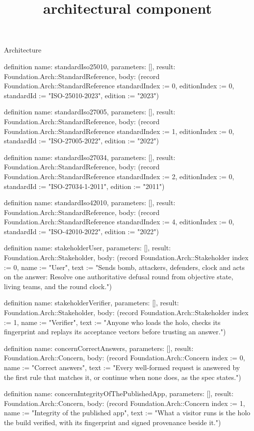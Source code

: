 \begin{lexlean}{Architecture}
\title{architectural component}
\begin{semanticmodule}
definition{
  name: standardIso25010,
  parameters: [],
  result: Foundation.Arch::StandardReference,
  body: (record Foundation.Arch::StandardReference {standardIndex := 0, editionIndex := 0, standardId := "ISO-25010-2023", edition := "2023"})
}

definition{
  name: standardIso27005,
  parameters: [],
  result: Foundation.Arch::StandardReference,
  body: (record Foundation.Arch::StandardReference {standardIndex := 1, editionIndex := 0, standardId := "ISO-27005-2022", edition := "2022"})
}

definition{
  name: standardIso27034,
  parameters: [],
  result: Foundation.Arch::StandardReference,
  body: (record Foundation.Arch::StandardReference {standardIndex := 2, editionIndex := 0, standardId := "ISO-27034-1-2011", edition := "2011"})
}

definition{
  name: standardIso42010,
  parameters: [],
  result: Foundation.Arch::StandardReference,
  body: (record Foundation.Arch::StandardReference {standardIndex := 4, editionIndex := 0, standardId := "ISO-42010-2022", edition := "2022"})
}

definition{
  name: stakeholderUser,
  parameters: [],
  result: Foundation.Arch::Stakeholder,
  body: (record Foundation.Arch::Stakeholder {index := 0, name := "User", text := "Sends bomb, attackers, defenders, clock and acts on the answer: Resolve one authoritative defusal round from objective state, living teams, and the round clock."})
}

definition{
  name: stakeholderVerifier,
  parameters: [],
  result: Foundation.Arch::Stakeholder,
  body: (record Foundation.Arch::Stakeholder {index := 1, name := "Verifier", text := "Anyone who loads the holo, checks its fingerprint and replays its acceptance vectors before trusting an answer."})
}

definition{
  name: concernCorrectAnswers,
  parameters: [],
  result: Foundation.Arch::Concern,
  body: (record Foundation.Arch::Concern {index := 0, name := "Correct answers", text := "Every well-formed request is answered by the first rule that matches it, or continue when none does, as the spec states."})
}

definition{
  name: concernIntegrityOfThePublishedApp,
  parameters: [],
  result: Foundation.Arch::Concern,
  body: (record Foundation.Arch::Concern {index := 1, name := "Integrity of the published app", text := "What a visitor runs is the holo the build verified, with its fingerprint and signed provenance beside it."})
}


\end{semanticmodule}
\end{lexlean}
